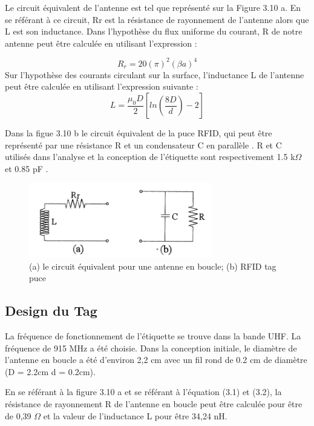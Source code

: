 \documentclass[11pt, a4paper, twoside]{book}
\begin{document}
Le circuit équivalent de l'antenne est tel que représenté sur la Figure 3.10 a. En se référant à ce circuit, Rr est la résistance de rayonnement de l'antenne alors que L est son inductance. Dans l'hypothèse du flux uniforme du courant, R de notre antenne  peut être calculée en utilisant l'expression \cite{antennatheory}:

\begin{equation}
R_{r}  = 20 (\pi)^{2}(\beta a)^{4}
\end{equation}
Sur l'hypothèse des courants circulant sur la surface, l'inductance L de l'antenne peut être calculée en utilisant l'expression suivante \cite{antennatheory}:
\begin{equation}
L  = \frac{\mu_{0}D}{2}[ln(\frac{8D}{d})-2]
\end{equation}

Dans la figue 3.10 b le circuit équivalent de la puce RFID, qui peut être représenté par une résistance R et un condensateur  C en parallèle . R et C utilisés dans l'analyse et la conception de l'étiquette sont respectivement 1.5 k\(\Omega\) et 0.85 pF .

\begin{figure}[H]
\centering
\includegraphics[width=8cm]{eq}
\caption{(a) le circuit équivalent pour  une antenne en boucle; (b) RFID tag puce}
\end{figure}

\subsection{Design du Tag}
La fréquence de fonctionnement de l'étiquette se trouve dans la bande UHF.
La fréquence de 915 MHz a été choisie. Dans la conception initiale, le diamètre de l'antenne en boucle a été d'environ 2,2 cm avec un fil rond de 0.2 cm de diamètre  (D = 2.2cm d = 0.2cm).

En se référant à la figure 3.10 a et se référant à l'équation (3.1) et (3.2), la résistance de rayonnement R de l'antenne en boucle peut être calculée pour être de 0,39  \(\Omega\) et la valeur de l'inductance L pour être  34,24 nH.\\
\end{document}
